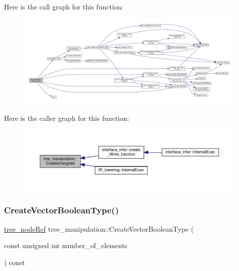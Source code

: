 Here is the call graph for this function\+:
\nopagebreak
\begin{figure}[H]
\begin{center}
\leavevmode
\includegraphics[width=350pt]{d0/d99/classtree__manipulation_af3f2f83696643419e666cf6d86221a95_cgraph}
\end{center}
\end{figure}
Here is the caller graph for this function\+:
\nopagebreak
\begin{figure}[H]
\begin{center}
\leavevmode
\includegraphics[width=350pt]{d0/d99/classtree__manipulation_af3f2f83696643419e666cf6d86221a95_icgraph}
\end{center}
\end{figure}
\mbox{\label{classtree__manipulation_a29640c2e27ae3aafa292806da7921110}} 
\subsubsection{\texorpdfstring{Create\+Vector\+Boolean\+Type()}{CreateVectorBooleanType()}}
{\footnotesize\ttfamily \hyperlink{tree__node_8hpp_a6ee377554d1c4871ad66a337eaa67fd5}{tree\+\_\+node\+Ref} tree\+\_\+manipulation\+::\+Create\+Vector\+Boolean\+Type (\begin{DoxyParamCaption}\item[{const unsigned int}]{number\+\_\+of\+\_\+elements }\end{DoxyParamCaption}) const}



